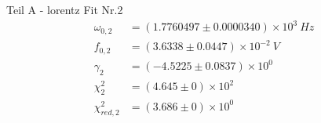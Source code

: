 {\LARGE Teil A - lorentz Fit Nr.2}
\begin{align*}
	\omega_{0,2} &= \left(1.7760497 \pm 0.0000340\right) \times 10^{3}\ Hz\\
	f_{0,2} &= \left(3.6338 \pm 0.0447\right) \times 10^{-2}\ V\\
	\gamma_2 &= \left(-4.5225 \pm 0.0837\right) \times 10^{0}\ \\
	\chi^2_{2} &= \left(4.645 \pm 0\right) \times 10^{2}\ \\
	\chi^2_{red,2} &= \left(3.686 \pm 0\right) \times 10^{0}\ \\
\end{align*}